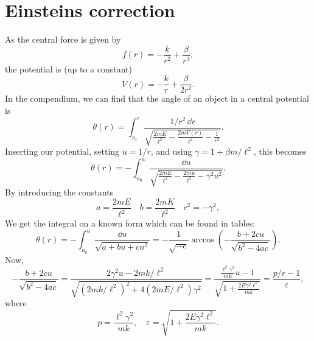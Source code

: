 \documentclass{article}
\begin{document}
    \section{Einsteins correction}
        As the central force is given by
        \begin{equation*}
            f(r) = - \frac{k}{r^2} + \frac{\beta}{r^3},
        \end{equation*}
        the potential is (up to a constant)
        \begin{equation*}
            V(r) = - \frac{k}{r} + \frac{\beta}{2 r^2}.
        \end{equation*}
        In the compendium, we can find that the angle of an object in a central potential is
        \begin{equation*}
            \theta(r) = \int_{r_0}^r \frac{1 / r^2 \, \dd r}{\sqrt{\frac{2 m E}{\ell^2} - \frac{2 m V(r)}{\ell^2} - \frac{1}{r^2}}}.
        \end{equation*}
        Inserting our potential, setting $u = 1/r$, and using $\gamma = 1 + \beta m / \ell^2$, this becomes
        \begin{equation*}
            \theta(r) = -\int_{u_0}^u \frac{\dd u}{\sqrt{\frac{2 m E}{\ell^2} - \frac{2 m u}{\ell^2} - \gamma^2 u^2}}.
        \end{equation*}
        By introducing the constants
        \begin{equation*}
            a = \frac{2mE}{\ell^2}\quad b = \frac{2 m K}{\ell^2} \quad c^2 = -\gamma^2,
        \end{equation*}
        We get the integral on a known form which can be found in tables:
        \begin{equation*}
            \theta(r) = -\int_{u_0}^u \frac{\dd u}{\sqrt{a + b u + c u^2}} 
            = -\frac{1}{\sqrt{-c}} \arccos \left(-\frac{b + 2c u}{\sqrt{b^2 - 4 a c}}\right).
        \end{equation*}
        Now,
        \begin{equation*}
            -\frac{b + 2c u}{\sqrt{b^2 - 4 a c}} = \frac{2\gamma^2u - 2mk/\ell^2}{\sqrt{\left(2 mk/\ell^2\right)^2 + 4\left(2mE/\ell^2\right)\gamma^2}} 
            = \frac{\frac{\ell^2 \gamma^2}{mk}u - 1}{\sqrt{1 + \frac{2E\gamma^2 \ell^2}{mk}}} = \frac{p / r - 1}{\varepsilon},
        \end{equation*}
        where
        \begin{equation*}
            p = \frac{\ell^2 \gamma^2}{mk}, \quad  \varepsilon = \sqrt{1 + \frac{2E\gamma^2 \ell^2}{mk}}.
        \end{equation*}
\end{document}
